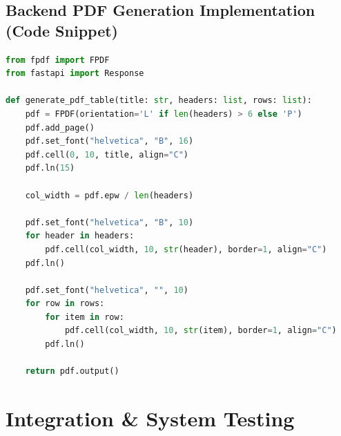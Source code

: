 \documentclass[12pt,a4paper]{report}
\begin{document}
\subsection{Backend PDF Generation Implementation (Code Snippet)}
\begin{lstlisting}[language=Python, caption=Dynamic PDF Streaming Implementation]
from fpdf import FPDF
from fastapi import Response

def generate_pdf_table(title: str, headers: list, rows: list):
    pdf = FPDF(orientation='L' if len(headers) > 6 else 'P')
    pdf.add_page()
    pdf.set_font("helvetica", "B", 16)
    pdf.cell(0, 10, title, align="C")
    pdf.ln(15)
    
    col_width = pdf.epw / len(headers)
    
    pdf.set_font("helvetica", "B", 10)
    for header in headers:
        pdf.cell(col_width, 10, str(header), border=1, align="C")
    pdf.ln()
    
    pdf.set_font("helvetica", "", 10)
    for row in rows:
        for item in row:
            pdf.cell(col_width, 10, str(item), border=1, align="C")
        pdf.ln()
        
    return pdf.output()
\end{lstlisting}

\section{Integration \& System Testing}
\end{document}
